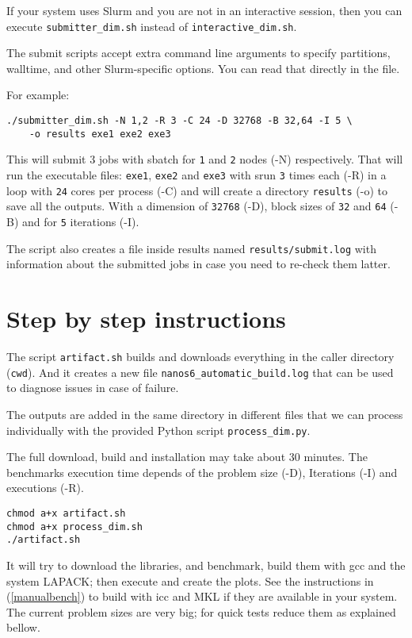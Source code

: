 \documentclass{article}
\newcommand{\code}[1]{\texttt{#1}}
\begin{document}
If your system uses Slurm and you are not in an interactive session,
then you can execute \code{submitter\_dim.sh} instead of
\code{interactive\_dim.sh}.

The submit scripts accept extra command line arguments to specify
partitions, walltime, and other Slurm-specific options. You can read
that directly in the file.

For example:

\begin{lstlisting}
./submitter_dim.sh -N 1,2 -R 3 -C 24 -D 32768 -B 32,64 -I 5 \
	-o results exe1 exe2 exe3
\end{lstlisting}

This will submit 3 jobs with sbatch for \code{1} and \code{2} nodes
(-N) respectively. That will run the executable files: \code{exe1},
\code{exe2} and \code{exe3} with srun \code{3} times each (-R) in a
loop with \code{24} cores per process (-C) and will create a directory
\code{results} (-o) to save all the outputs. With a dimension of
\code{32768} (-D), block sizes of \code{32} and \code{64} (-B) and for
\code{5} iterations (-I).

The script also creates a file inside results named
\code{results/submit.log} with information about the submitted jobs in
case you need to re-check them latter.

\section{Step by step instructions}\label{SBS}

The script \code{artifact.sh} builds and downloads everything in the
caller directory (\code{cwd}). And it creates a new file
\code{nanos6\_automatic\_build.log} that can be used to diagnose
issues in case of failure.

The outputs are added in the same directory in different files that we
can process individually with the provided Python script
\code{process\_dim.py}.

The full download, build and installation may take about 30
minutes. The benchmarks execution time depends of the problem size
(-D), Iterations (-I) and executions (-R).

\begin{lstlisting}
chmod a+x artifact.sh
chmod a+x process_dim.sh
./artifact.sh
\end{lstlisting}

It will try to download the libraries, and benchmark, build them with
gcc and the system LAPACK; then execute and create the plots. See the
instructions in (\ref{manualbench}) to build with icc and MKL if they
are available in your system. The current problem sizes are very big;
for quick tests reduce them as explained bellow.
\end{document}
